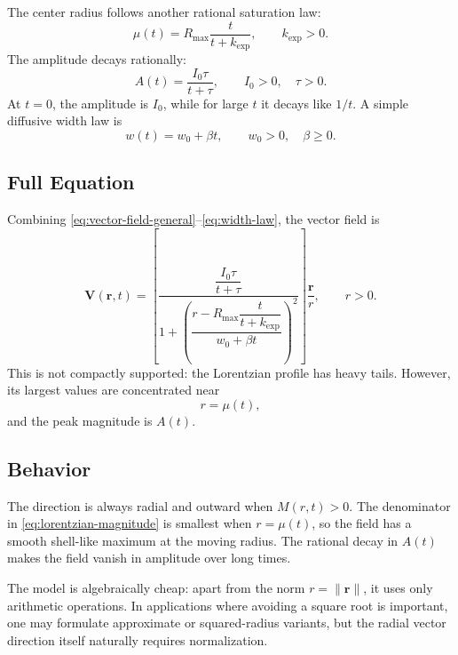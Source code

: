 The center radius follows another rational saturation law:
\begin{equation}
    \mu(t)
    =
    R_{\max}\frac{t}{t+k_{\mathrm{exp}}},
    \qquad k_{\mathrm{exp}}>0.
    \label{eq:center-radius}
\end{equation}
The amplitude decays rationally:
\begin{equation}
    A(t)
    =
    \frac{I_0\tau}{t+\tau},
    \qquad I_0>0,\quad \tau>0.
    \label{eq:amplitude-decay}
\end{equation}
At \(t=0\), the amplitude is \(I_0\), while for large \(t\) it decays like
\(1/t\). A simple diffusive width law is
\begin{equation}
    w(t)=w_0+\beta t,
    \qquad w_0>0,\quad \beta\ge 0.
    \label{eq:width-law}
\end{equation}

\subsection{Full Equation}

Combining \eqref{eq:vector-field-general}--\eqref{eq:width-law}, the vector
field is
\begin{equation}
    \bm{V}(\bm{r},t)
    =
    \left[
        \frac{
            \dfrac{I_0\tau}{t+\tau}
        }
        {
            1+
            \left(
                \dfrac{
                    r-R_{\max}\dfrac{t}{t+k_{\mathrm{exp}}}
                }
                {w_0+\beta t}
            \right)^2
        }
    \right]
    \frac{\bm{r}}{r},
    \qquad r>0.
    \label{eq:full-vector-field}
\end{equation}
This is not compactly supported: the Lorentzian profile has heavy tails.
However, its largest values are concentrated near
\[
    r=\mu(t),
\]
and the peak magnitude is \(A(t)\).

\subsection{Behavior}

The direction is always radial and outward when \(M(r,t)>0\). The denominator
in \eqref{eq:lorentzian-magnitude} is smallest when \(r=\mu(t)\), so the field
has a smooth shell-like maximum at the moving radius. The rational decay in
\(A(t)\) makes the field vanish in amplitude over long times.

The model is algebraically cheap: apart from the norm \(r=\|\bm{r}\|\), it uses
only arithmetic operations. In applications where avoiding a square root is
important, one may formulate approximate or squared-radius variants, but the
radial vector direction itself naturally requires normalization.

